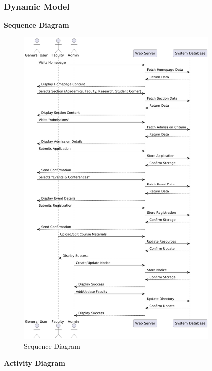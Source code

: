 \documentclass[11pt]{article}
\begin{document}
\subsubsection{Dynamic Model}
\begin{customItemize}
    \item \textbf{Sequence Diagram}
    \FloatBarrier
    \begin{figure}[H]
        \centering
        \includegraphics[height=16cm]{Seq Diagram.png}
        \caption{Sequence Diagram}
    \end{figure}
    \FloatBarrier
    \newpage
    \item \textbf{Activity Diagram}
    \FloatBarrier
    \begin{figure}[H]
        \centering

\end{figure}
\end{customItemize}
\end{document}
